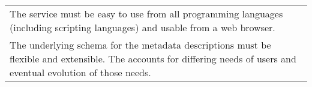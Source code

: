 \begin{table}
\begin{tabular}{p{}}
\\ The service must be easy to use from all programming languages
  (including scripting languages) and usable from a web browser.

\\ The underlying schema for the metadata descriptions must be
  flexible and extensible.  The accounts for differing needs of users
  and eventual evolution of those needs.

\\

\hline\hline
\end{tabular}
\end{table}

